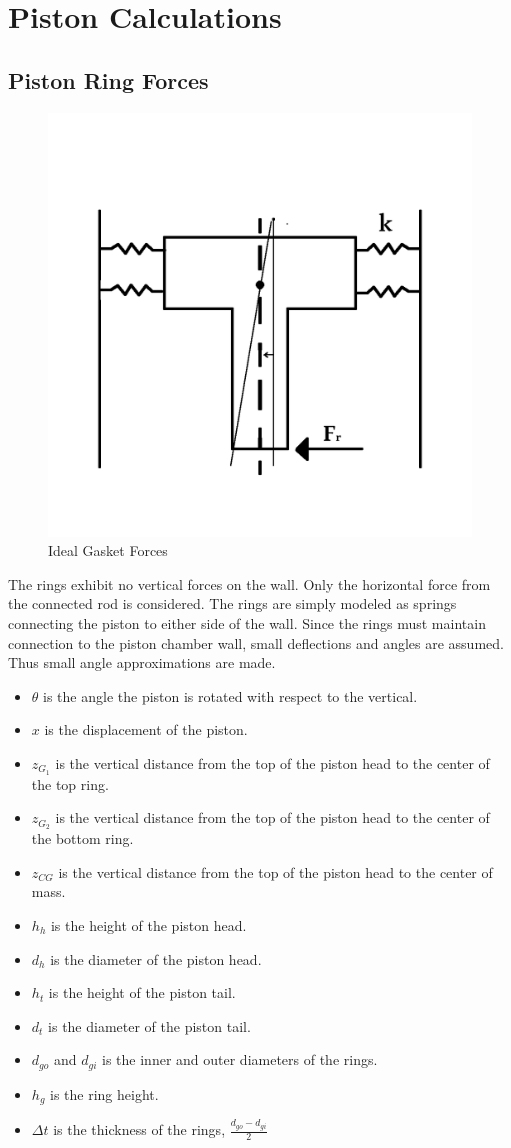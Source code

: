 \documentclass[10pt,a4paper]{article}
\begin{document}
\section*{Piston Calculations}
\subsection*{Piston Ring Forces}
	\begin{figure}[h]
		\centering
		\includegraphics[width=.75\textwidth]{PistonDiagram.png}
		\caption{Ideal Gasket Forces}
		\label{fig:diagram1}
	\end{figure}
	The rings exhibit no vertical forces on the wall. Only the horizontal force from the connected rod is considered.
	The rings are simply modeled as springs connecting the piston to either side of the wall. Since the rings must maintain connection to the piston chamber wall, small deflections and angles are assumed. Thus small angle approximations are made.
	\begin{itemize}
	\item $\theta$ is the angle the piston is rotated with respect to the vertical.
	\item $x$ is the displacement of the piston.
	\item $z_{G_1}$ is the vertical distance from the top of the piston head to the center of the top ring.
	\item $z_{G_2}$ is the vertical distance from the top of the piston head to the center of the bottom ring.
	\item $z_{CG}$ is the vertical distance from the top of the piston head to the center of mass.
	\item $h_h$ is the height of the piston head.
	\item $d_h$ is the diameter of the piston head.
	\item $h_t$ is the height of the piston tail.
	\item $d_t$ is the diameter of the piston tail.
	\item $d_{go}$ and $d_{gi}$ is the inner and outer diameters of the rings.
	\item $h_g$ is the ring height.
	\item $\Delta t$ is the thickness of the rings, $\frac{d_{go}-d_{gi}}{2} $
	\end{itemize}
\end{document}
